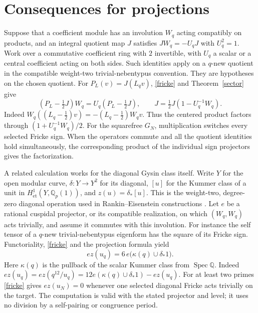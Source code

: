 \documentclass[11pt]{article}
\begin{document}
\section{Consequences for projections}
Suppose that a coefficient module has an involution $W_q$ acting
compatibly on products, and an integral quotient map $J$ satisfies
$JW_q=-U_qJ$ with $U_q^2=1$. Work over a commutative coefficient
ring with $2$ invertible, with $U_q$ a scalar or a central coefficient
acting on both sides. Such identities apply on a $q$-new quotient
in the compatible weight-two trivial-nebentypus convention. They
are hypotheses on the chosen quotient. For $P_L(v)=J(L_qv)$,
\eqref{fricke} and Theorem~\ref{sector} give
\[
 (P_L-\tfrac12 J)W_q=U_q(P_L-\tfrac12 J),\qquad
 J=\tfrac12 J(1-U_q^{-1}W_q).
\]
Indeed $W_q((L_q-\tfrac12)v)=-(L_q-\tfrac12)W_qv$.
Thus the centered product factors through $(1+U_q^{-1}W_q)/2$.
For the squarefree $G_N$, multiplication switches every selected
Fricke sign. When the operators commute and all the quotient
identities hold simultaneously, the corresponding product
of the individual sign projectors gives the factorization.

A related calculation works for the diagonal Gysin class itself.
Write $Y$ for the open modular curve, $\delta:Y\to Y^2$ for its
diagonal, $[u]$ for the Kummer class of a unit in
$H^1_{\mathrm{\acute et}}(Y,\mathbb Q_p(1))$, and
$z(u)=\delta_*[u]$. This is the weight-two, degree-zero diagonal
operation used in Rankin--Eisenstein constructions \cite[\S5]{KLZ}.
Let $e$ be a rational cuspidal projector, or its compatible
realization, on which $(W_q,W_q)$ acts trivially, and assume it
commutes with this involution. For instance the self tensor of a
$q$-new trivial-nebentypus eigenform has the square of its Fricke
sign. Functoriality, \eqref{fricke} and the projection formula yield
\[
     e z(u_q)=6\,e\bigl(\kappa(q)\cup\delta_*1\bigr).
\]
Here $\kappa(q)$ is the pullback of the scalar Kummer class from
$\operatorname{Spec}\mathbb Q$. Indeed
$ez(u_q)=ez(q^{12}/u_q)=12e(\kappa(q)\cup\delta_*1)-ez(u_q)$.
For at least two primes \eqref{fricke} gives $ez(u_N)=0$ whenever
one selected diagonal Fricke acts trivially on the target. The
computation is valid with the stated projector and level; it uses
no division by a self-pairing or congruence period.
\end{document}
